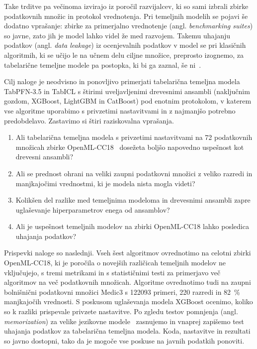 \documentclass[a4paper,12pt,openright]{book}
\begin{document}
Take trditve pa večinoma izvirajo iz poročil razvijalcev, ki so sami izbrali
zbirke podatkovnih množic in protokol vrednotenja. Pri temeljnih modelih se
pojavi še dodatno vprašanje: zbirke za primerjalno
vrednotenje (angl. \emph{benchmarking suites}) so javne, zato jih je model
lahko videl že med razvojem. Takemu uhajanju podatkov (angl. \emph{data
leakage}) iz ocenjevalnih podatkov v model se pri klasičnih algoritmih, ki se
učijo le na učnem delu ciljne množice, preprosto izognemo, za tabelarične
temeljne modele pa postopka, ki bi ga zaznal, še ni~\cite{erickson2025tabarena}.

Cilj naloge je neodvisno in ponovljivo primerjati tabelarična temeljna modela
TabPFN-3.5 in TabICL s štirimi uveljavljenimi drevesnimi ansambli (naključnim
gozdom, XGBoost, LightGBM in CatBoost) pod enotnim protokolom, v katerem vse
algoritme uporabimo s privzetimi nastavitvami in z najmanjšo potrebno
predobdelavo. Zastavimo si štiri raziskovalna vprašanja.
\begin{enumerate}
\item Ali tabelarična temeljna modela s privzetimi nastavitvami na 72
podatkovnih množicah zbirke OpenML-CC18~\cite{bischl2021openml} dosežeta boljšo
napovedno uspešnost kot drevesni ansambli?
\item Ali se prednost ohrani na veliki zaupni podatkovni množici z veliko
razredi in manjkajočimi vrednostmi, ki je modela nista mogla videti?
\item Kolikšen del razlike med temeljnima modeloma in drevesnimi ansambli zapre
uglaševanje hiperparametrov enega od ansamblov?
\item Ali je uspešnost temeljnih modelov na zbirki OpenML-CC18 lahko
posledica uhajanja podatkov?
\end{enumerate}

Prispevki naloge so naslednji. Vseh šest algoritmov ovrednotimo na celotni
zbirki OpenML-CC18, ki je poročila o novejših različicah temeljnih modelov ne
vključujejo, s tremi metrikami in s statističnimi testi za primerjavo več
algoritmov na več podatkovnih množicah. Algoritme ovrednotimo tudi na zaupni
bolnišnični podatkovni množici Medic3 s \num{122093} primeri, 220 razredi in
\SI{82}{\percent} manjkajočih vrednosti. S poskusom uglaševanja modela XGBoost
ocenimo, koliko so k razliki prispevale privzete nastavitve. Po zgledu
testov pomnjenja (angl. \emph{memorization}) za velike jezikovne
modele~\cite{bordt2024elephants} zasnujemo
in vnaprej zapišemo test uhajanja podatkov za tabelarična temeljna modela. Koda,
nastavitve in rezultati so javno dostopni, tako da je mogoče vse poskuse na
javnih podatkih ponoviti.
\end{document}
